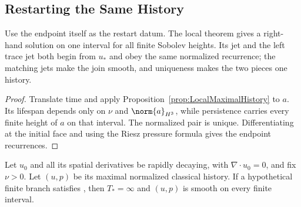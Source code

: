 \subsection{Restarting the Same History}\label{sub:RestartingTheSameHistory}

Use the endpoint itself as the restart datum.  The local theorem gives a
right-hand solution on one interval for all finite Sobolev heights.  Its jet and
the left trace jet both begin from \(u_*\) and obey the same normalized
recurrence; the matching jets make the join smooth, and uniqueness makes the
two pieces one history.


\begin{proof}
Translate time and apply Proposition~\ref{prop:LocalMaximalHistory} to \(a\).
Its lifespan depends only on \(\nu\) and \(\norm{a}_{H^3}\), while persistence
carries every finite height of \(a\) on that interval.  The normalized pair is
unique.  Differentiating at the initial face and using the Riesz pressure formula
gives the endpoint recurrences.
\end{proof}

\begin{theorem}\label{thm:CompatibleIntersectionClosure}
Let \(u_0\) and all its spatial derivatives be rapidly decaying, with
\(\nabla\cdot u_0=0\), and fix \(\nu>0\).  Let \((u,p)\) be its maximal
normalized classical history.  If a hypothetical finite branch satisfies
, then \(T_*=\infty\) and
\((u,p)\) is smooth on every finite interval.
\end{theorem}

